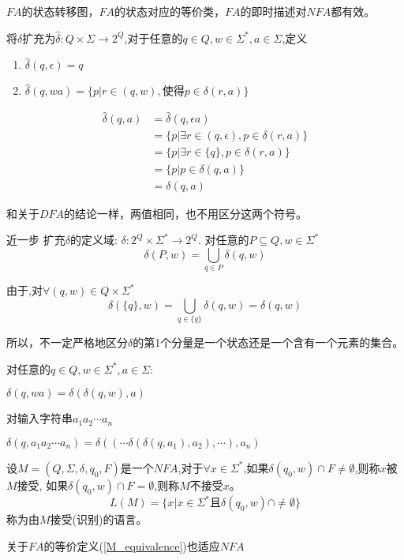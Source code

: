 \begin{note}
	$FA$的状态转移图，$FA$的状态对应的等价类，$FA$的即时描述对$NFA$都有效。
\end{note}

将$\delta$扩充为$\hat{\delta}:Q\times\Sigma\to 2^Q$,对于任意的$q\in Q,w\in\Sigma^\ast,a\in\Sigma$,定义
\begin{enumerate}
	\item $\hat{\delta}(q,\epsilon)=q$
	\item $\hat{\delta}(q,wa)=\{p|r\in(q,w),\text{使得}p\in\delta(r,a)\}$
\end{enumerate}

\begin{align*}
\hat{\delta}(q,a) &=\hat{\delta}(q,\epsilon a)\\
&=\{p|\exists r\in(q,\epsilon),p\in\delta(r,a)\} \\
&=\{p|\exists r\in\{q\},p\in\delta(r,a)\} \\
&=\{p|p\in\delta(q,a)\}\\
&=\delta(q,a)
\end{align*}

和关于$DFA$的结论一样，两值相同，也不用区分这两个符号。 

近一步 扩充$\delta$的定义域: $\delta: 2^Q\times\Sigma^\ast\to 2^Q$. 对任意的$P\subseteq Q,w\in\Sigma^\ast$
\[\delta(P,w)=\bigcup_{q\in P}\delta(q,w)\]

由于,对$\forall(q,w)\in Q\times\Sigma^\ast$
\[\delta(\{q\},w) = \bigcup_{q\in\{q\}}\delta(q,w) = \delta(q,w)\]

所以，不一定严格地区分$\delta$的第1个分量是一个状态还是一个含有一个元素的集合。

对任意的$q\in Q,w\in\Sigma^\ast,a\in\Sigma$:

$\delta(q,wa)=\delta(\delta(q,w),a)$

对输入字符串$a_1a_2\cdots a_n$

$\delta(q,a_1a_2\cdots a_n)=\delta((\cdots\delta(\delta(q,a_1),a_2),\cdots),a_n)$

\begin{definition}
	设$M=(Q,\Sigma,\delta,q_0,F)$是一个$NFA$,对于$\forall x\in\Sigma^\ast$,如果$\delta(q_0,w)\cap F\ne\emptyset$,则称$x$被$M$接受, 如果$\delta(q_0,w)\cap F=\emptyset$,则称$M$不接受$x$。
	\[L(M)=\{x|x\in\Sigma^\ast\text{且}\delta(q_0,w)\cap\ne\emptyset\}\] 
	称为由$M$接受(识别)的语言。
\end{definition}

关于$FA$的等价定义(\ref{M_equivalence})也适应$NFA$

